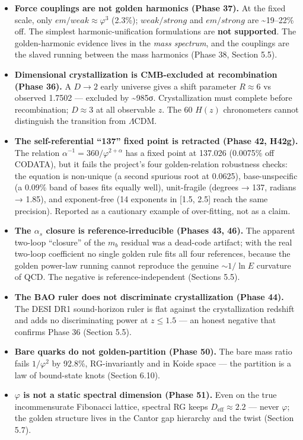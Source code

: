 \documentclass[
  11pt,
]{article}
\providecommand{\tightlist}{%
  \setlength{\itemsep}{0pt}\setlength{\parskip}{0pt}}
\begin{document}
\begin{itemize}
\tightlist
\item
  \textbf{Force couplings are not golden harmonics (Phase 37).} At the
  fixed scale, only \(em/weak \approx \varphi^3\) (2.3\%);
  \(weak/strong\) and \(em/strong\) are \textasciitilde19--22\% off. The
  simplest harmonic-unification formulations are \textbf{not supported}.
  The golden-harmonic evidence lives in the \emph{mass spectrum}, and
  the couplings are the slaved running between the mass harmonics (Phase
  38, Section 5.5).
\item
  \textbf{Dimensional crystallization is CMB-excluded at recombination
  (Phase 36).} A \(D \to 2\) early universe gives a shift parameter
  \(R \approx 6\) vs observed 1.7502 --- excluded by
  \textasciitilde985σ. Crystallization must complete before
  recombination; \(D \approx 3\) at all observable \(z\). The 60
  \(H(z)\) chronometers cannot distinguish the transition from
  \(\Lambda\)CDM.
\item
  \textbf{The self-referential ``137'' fixed point is retracted (Phase
  42, H42g).} The relation \(\alpha^{-1} = 360/\varphi^{2+\alpha}\) has
  a fixed point at 137.026 (0.0075\% off CODATA), but it fails the
  project's four golden-relation robustness checks: the equation is
  non-unique (a second spurious root at 0.0625), base-unspecific (a
  0.09\% band of bases fits equally well), unit-fragile (degrees → 137,
  radians → 1.85), and exponent-free (14 exponents in {[}1.5, 2.5{]}
  reach the same precision). Reported as a cautionary example of
  over-fitting, not as a claim.
\item
  \textbf{The \(\alpha_s\) closure is reference-irreducible (Phases 43,
  46).} The apparent two-loop ``closure'' of the \(m_b\) residual was a
  dead-code artifact; with the real two-loop coefficient no single
  golden rule fits all four references, because the golden power-law
  running cannot reproduce the genuine \(\sim 1/\ln E\) curvature of
  QCD. The negative is reference-independent (Sections 5.5).
\item
  \textbf{The BAO ruler does not discriminate crystallization (Phase
  44).} The DESI DR1 sound-horizon ruler is flat against the
  crystallization redshift and adds no discriminating power at
  \(z \le 1.5\) --- an honest negative that confirms Phase 36 (Section
  5.5).
\item
  \textbf{Bare quarks do not golden-partition (Phase 50).} The bare mass
  ratio fails \(1/\varphi^2\) by 92.8\%, RG-invariantly and in Koide
  space --- the partition is a law of bound-state knots (Section 6.10).
\item
  \textbf{\(\varphi\) is not a static spectral dimension (Phase 51).}
  Even on the true incommensurate Fibonacci lattice, spectral RG keeps
  \(D_{\text{eff}} \approx 2.2\) --- never \(\varphi\); the golden
  structure lives in the Cantor gap hierarchy and the twist (Section
  5.7).
\end{itemize}
\end{document}
